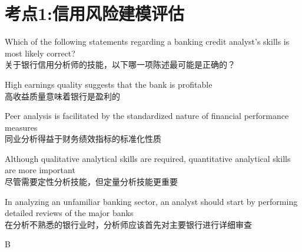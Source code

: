 \documentclass{article}
\newcounter{question} %
\begin{document}
 \tableofcontents %
\newpage




\section{考点1:信用风险建模评估}
\setcounter{question}{0}

\begin{question}
    Which of the following statements regarding a banking credit analyst's skills is most likely correct?
    \\ 关于银行信用分析师的技能，以下哪一项陈述最可能是正确的？
\end{question}

\begin{choices}
    \item High earnings quality suggests that the bank is profitable\\
    高收益质量意味着银行是盈利的
    \item Peer analysis is facilitated by the standardized nature of financial performance measures\\
    同业分析得益于财务绩效指标的标准化性质
    \item Although qualitative analytical skills are required, quantitative analytical skills are more important\\
    尽管需要定性分析技能，但定量分析技能更重要
    \item In analyzing an unfamiliar banking sector, an analyst should start by performing detailed reviews of the major banks\\
    在分析不熟悉的银行业时，分析师应该首先对主要银行进行详细审查
\end{choices}

\begin{correctanswer}
    B
\end{correctanswer}
\end{document}
